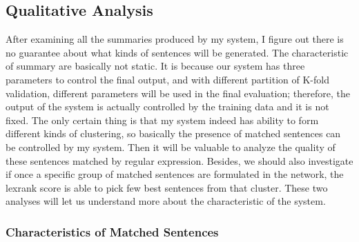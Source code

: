 \documentclass[hyp]{socreport}
\begin{document}
\subsection{Qualitative Analysis}

After examining all the summaries produced by my system, I figure out there is no guarantee about what kinds of sentences will be generated. The characteristic of summary are basically not static. It is because our system has three parameters to control the final output, and with different partition of K-fold validation, different parameters will be used in the final evaluation; therefore, the output of the system is actually controlled by the training data and it is not fixed. The only certain thing is that my system indeed has ability to form different kinds of clustering, so basically the presence of matched sentences can be controlled by my system. Then it will be valuable to analyze the quality of these sentences matched by regular expression. Besides, we should also investigate if once a specific group of matched sentences are formulated in the network, the lexrank score is able to pick few best sentences from that cluster. These two analyses will let us understand more about the characteristic of the system.

\subsubsection{Characteristics of Matched Sentences}
\end{document}
